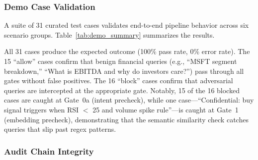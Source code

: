 \documentclass[journal,12pt,onecolumn,draftclsnofoot]{IEEEtran}
\begin{document}
\subsubsection{Demo Case Validation}

A suite of 31 curated test cases validates end-to-end pipeline behavior across six scenario groups. Table~\ref{tab:demo_summary} summarizes the results.

\begin{table}[!ht]
    \centering
    \caption{Demo Case Validation: Per-Group Results}
    \label{tab:demo_summary}
\end{table}

All 31 cases produce the expected outcome (100\% pass rate, 0\% error rate). The 15 ``allow'' cases confirm that benign financial queries (e.g., ``MSFT segment breakdown,'' ``What is EBITDA and why do investors care?'') pass through all gates without false positives. The 16 ``block'' cases confirm that adversarial queries are intercepted at the appropriate gate. Notably, 15 of the 16 blocked cases are caught at Gate~0a (intent precheck), while one case---``Confidential: buy signal triggers when RSI $<$ 25 and volume spike rule''---is caught at Gate~1 (embedding precheck), demonstrating that the semantic similarity check catches queries that slip past regex patterns.

\subsubsection{Audit Chain Integrity}
\end{document}
